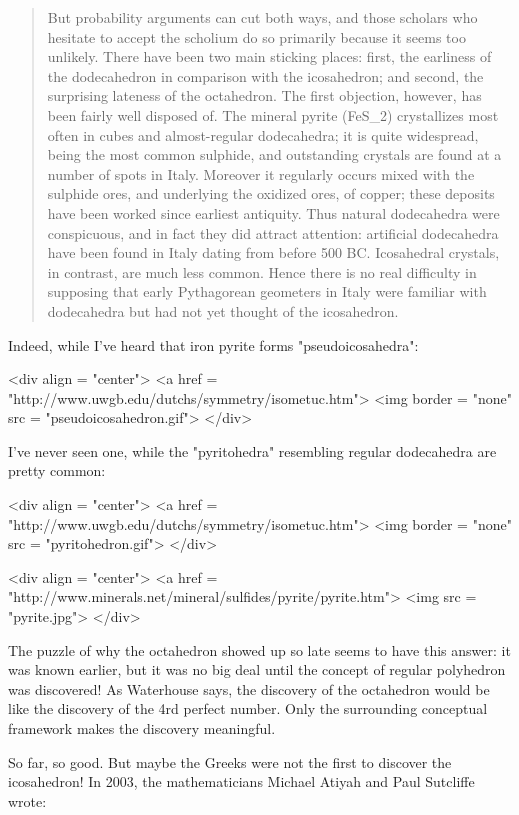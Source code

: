 \begin{quote}
   But probability arguments can cut both ways, and those scholars 
   who hesitate to accept the scholium do so primarily because it 
   seems too unlikely.  There have been two main sticking places: 
   first, the earliness of the dodecahedron in comparison with the 
   icosahedron; and second, the surprising lateness of the octahedron.
   The first objection, however, has been fairly well disposed of.  
   The mineral pyrite (FeS_{2}) crystallizes most often in cubes and 
   almost-regular dodecahedra; it is quite widespread, being the most 
   common sulphide, and outstanding crystals are found at a number 
   of spots in Italy.  Moreover it regularly occurs mixed with the 
   sulphide ores, and underlying the oxidized ores, of copper; these 
   deposits have been worked since earliest antiquity.  Thus natural 
   dodecahedra were conspicuous, and in fact they did attract 
   attention: artificial dodecahedra have been found in Italy dating 
   from before 500 BC.  Icosahedral crystals, in contrast, are much
   less common.  Hence there is no real difficulty in supposing that 
   early Pythagorean geometers in Italy were familiar with dodecahedra 
   but had not yet thought of the icosahedron.
\end{quote}

Indeed, while I've heard that iron pyrite forms "pseudoicosahedra":

<div align = "center">
<a href = "http://www.uwgb.edu/dutchs/symmetry/isometuc.htm">
<img border = "none" src = "pseudoicosahedron.gif">
</div>

I've never seen one, while the "pyritohedra" resembling regular 
dodecahedra are pretty common:

<div align = "center">
<a href = "http://www.uwgb.edu/dutchs/symmetry/isometuc.htm">
<img border = "none" src = "pyritohedron.gif">
</div>

<div align = "center">
<a href = "http://www.minerals.net/mineral/sulfides/pyrite/pyrite.htm">
<img src = "pyrite.jpg">
</div>



The puzzle of why the octahedron showed up so late seems to have this
answer: it was known earlier, but it was no big deal until the concept of
regular polyhedron was discovered!  As Waterhouse says, the discovery
of the octahedron would be like the discovery of the 4rd perfect number.
Only the surrounding conceptual framework makes the discovery 
meaningful.

So far, so good.  But maybe the Greeks were not the first to discover 
the icosahedron!  In 2003, the mathematicians Michael Atiyah and 
Paul Sutcliffe wrote:

